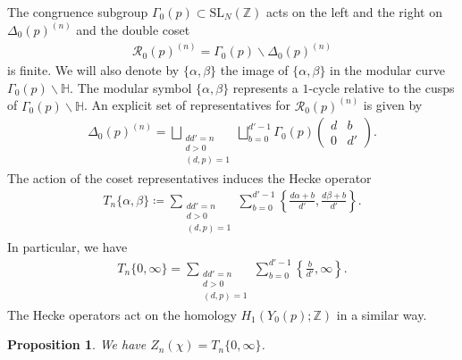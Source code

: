\documentclass[a4paper,11pt]{amsart} %
\newcommand{\8}{\infty}
\newcommand{\Z}{\mathbb{Z}}
\newcommand{\SL}{\mathrm{SL}}
\newcommand{\HH}{\mathbb{H}}
\newcommand{\Rcal}{\mathcal{R}}
\theoremstyle{mytheoremstyle}
\newtheorem{prop}[thm]{Proposition}
\theoremstyle{remark}
\numberwithin{equation}{section}
\begin{document}
The congruence subgroup $\Gamma_0(p) \subset \SL_N(\Z)$ acts on the left and the right on $\Delta_0(p)^{(n)}$ and the double coset
\begin{align} \label{doublecosets}
    \Rcal_0(p)^{(n)}=\Gamma_0(p) \backslash \Delta_0(p)^{(n)}
\end{align}
is finite. 
We will also denote by $\{\alpha,\beta\}$ the image of $\{\alpha,\beta\}$ in the modular curve $\Gamma_0(p) \backslash \HH$. The modular symbol $\{\alpha,\beta\}$ represents a $1$-cycle relative to the cusps of $\Gamma_0(p)\backslash \HH$. An explicit set of representatives for $\Rcal_0(p)^{(n)}$ is given by
\begin{align}
 \Delta_0(p)^{(n)} = \bigsqcup_{\substack {  dd'=n \\ d>0  \\ (d,p)=1} } \bigsqcup_{b=0}^{d'-1} \Gamma_0(p) \begin{pmatrix} 
      d & b \\ 0 & d'
  \end{pmatrix}.
\end{align}
The action of the coset representatives induces the Hecke operator
\begin{align}
    T_n\{\alpha,\beta\} \coloneqq \sum_{\substack {  dd'=n \\ d>0  \\ (d,p)=1} } \sum_{b=0}^{d'-1} \left \{  \frac{d\alpha+b}{d'},\frac{d\beta+b}{d'}\right \}.
\end{align}
In particular, we have
\begin{align}
    T_n\{0,\8\} = \sum_{\substack {  dd'=n \\ d>0  \\ (d,p)=1} } \sum_{b=0}^{d'-1}  \left \{ \frac{b}{d'},\8 \right \}.
\end{align}
The Hecke operators act on the homology $H_1(Y_0(p);\Z)$ in a similar way. 
\begin{prop} \label{cycleN2}
    We have $Z_n(\chi)=T_n\{0,\8\}$.
\end{prop}
\end{document}
